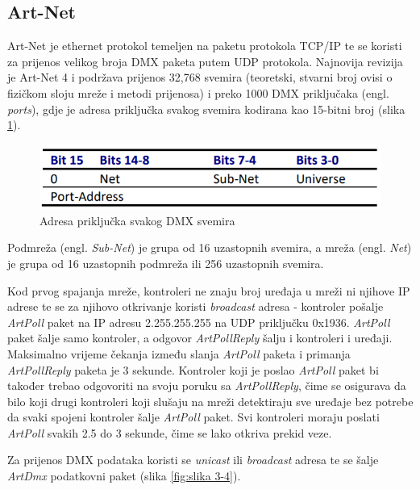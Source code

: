 \documentclass[times, utf8, zavrsni, numeric]{fer}
\begin{document}
\subsection{Art-Net}
Art-Net je ethernet protokol temeljen na paketu protokola TCP/IP te se koristi za prijenos velikog broja DMX paketa putem UDP protokola. Najnovija revizija je Art-Net 4 i podržava prijenos 32,768 svemira (teoretski, stvarni broj ovisi o fizičkom sloju mreže i metodi prijenosa) i preko 1000 DMX priključaka (engl. \emph{ports}), gdje je adresa priključka svakog svemira kodirana kao 15-bitni broj (slika \ref{fig:slika 3-3}).

\begin{figure}[htp]
	\centering
	\includegraphics[width=\linewidth]{slika 3-3.png}
	\caption{Adresa priključka svakog DMX svemira \cite{art-net}}
	\label{fig:slika 3-3}
\end{figure}

Podmreža (engl. \emph{Sub-Net}) je grupa od 16 uzastopnih svemira, a mreža (engl. \emph{Net}) je grupa od 16 uzastopnih podmreža ili 256 uzastopnih svemira.\newline

Kod prvog spajanja mreže, kontroleri ne znaju broj uređaja u mreži ni njihove IP adrese te se za njihovo otkrivanje koristi \emph{broadcast} adresa - kontroler pošalje \emph{ArtPoll} paket na IP adresu 2.255.255.255 na UDP priključku 0x1936. \emph{ArtPoll} paket šalje samo kontroler, a odgovor \emph{ArtPollReply} šalju i kontroleri i uređaji. Maksimalno vrijeme čekanja između slanja \emph{ArtPoll} paketa i primanja \emph{ArtPollReply} paketa je 3 sekunde. Kontroler koji je poslao \emph{ArtPoll} paket bi također trebao odgovoriti na svoju poruku sa \emph{ArtPollReply}, čime se osigurava da bilo koji drugi kontroleri koji slušaju na mreži detektiraju sve uređaje bez potrebe da svaki spojeni kontroler šalje \emph{ArtPoll} paket. Svi kontroleri moraju poslati \emph{ArtPoll} svakih 2.5 do 3 sekunde, čime se lako otkriva prekid veze.\newline

Za prijenos DMX podataka koristi se \emph{unicast} ili \emph{broadcast} adresa te se šalje \emph{ArtDmx} podatkovni paket (slika \ref{fig:slika 3-4}).
\end{document}
